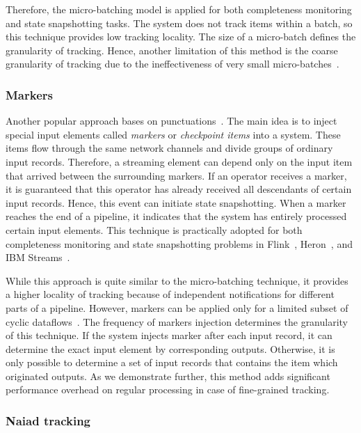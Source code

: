 Therefore, the micro-batching model is applied for both completeness monitoring and state snapshotting tasks. The system does not track items within a batch, so this technique provides low tracking locality. The size of a micro-batch defines the granularity of tracking. Hence, another limitation of this method is the coarse granularity of tracking due to the ineffectiveness of very small micro-batches~\cite{Zaharia:2012:DSE:2342763.2342773}.

\subsubsection{Markers}

Another popular approach bases on punctuations~\cite{Tucker:2003:EPS:776752.776780}. The main idea is to inject special input elements called {\em markers} or {\em checkpoint items} into a system. These items flow through the same network channels and divide groups of ordinary input records. Therefore, a streaming element can depend only on the input item that arrived between the surrounding markers. If an operator receives a marker, it is guaranteed that this operator has already received all descendants of certain input records. Hence, this event can initiate state snapshotting. When a marker reaches the end of a pipeline, it indicates that the system has entirely processed certain input elements. This technique is practically adopted for both completeness monitoring and state snapshotting problems in Flink~\cite{Carbone:2017:SMA:3137765.3137777}, Heron~\cite{Kulkarni:2015:THS:2723372.2742788}, and IBM Streams~\cite{jacques2016consistent}. 

While this approach is quite similar to the micro-batching technique, it provides a higher locality of tracking because of independent notifications for different parts of a pipeline. However, markers can be applied only for a limited subset of cyclic dataflows~\cite{carbone2018scalable}. The frequency of markers injection determines the granularity of this technique. If the system injects marker after each input record, it can determine the exact input element by corresponding outputs. Otherwise, it is only possible to determine a set of input records that contains the item which originated outputs. As we demonstrate further, this method adds significant performance overhead on regular processing in case of fine-grained tracking.

\subsubsection{Naiad tracking}

